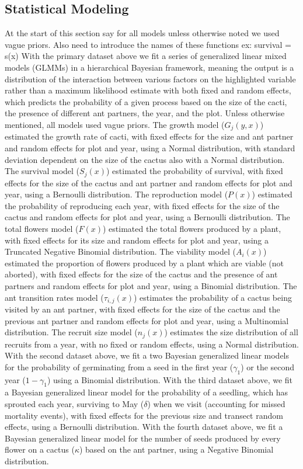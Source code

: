 \documentclass[12pt,a4paper]{article}
\begin{document}
		\subsection*{Statistical Modeling}
		At the start of this section say for all models unless otherwise noted we used vague priors. 
		Also need to introduce the names of these functions ex: survival = s(x)
		With the primary dataset above we fit a series of generalized linear mixed models (GLMMs) in a hierarchical Bayesian framework, meaning the output is a distribution of the interaction between various factors on the highlighted variable rather than a maximum likelihood estimate with both fixed and random effects, which predicts the probability of a given process based on the size of the cacti, the presence of different ant partners, the year, and the plot.
		Unless otherwise mentioned, all models used vague priors. 
		The growth model ($G_j(y,x)$) estimated the growth rate of cacti, with fixed effects for the size and ant partner and random effects for plot and year, using a Normal distribution, with standard deviation dependent on the size of the cactus also with a Normal distribution. 
		The survival model ($S_j(x)$) estimated the probability of survival, with fixed effects for the size of the cactus and ant partner and random effects for plot and year, using a Bernoulli distribution. 
		The reproduction model ($P(x)$) estimated the probability of reproducing each year, with fixed effects for the size of the cactus and random effects for plot and year, using a Bernoulli distribution. 
		The total flowers model ($F(x)$) estimated the total flowers produced by a plant, with fixed effects for its size and random effects for plot and year, using a Truncated Negative Binomial distribution. 
		The viability model ($A_i(x)$) estimated the proportion of flowers produced by a plant which are viable (not aborted), with fixed effects for the size of the cactus and the presence of ant partners and random effects for plot and year, using a Binomial distribution.
		The ant transition rates model ($\tau_{i,j}(x)$) estimates the probability of a cactus being visited by an ant partner, with fixed effects for the size of the cactus and the previous ant partner and random effects for plot and year, using a Multinomial distribution.  
		The recruit size model ($n_j(x)$) estimates the size distribution of all recruits from a year, with no fixed or random effects, using a Normal distribution. 
		With the second dataset above, we fit a two Bayesian generalized linear models for the 
		probability of germinating from a seed in the first year ($\gamma_1$) or the second year ($1 - \gamma_1$) using a Binomial distribution.
		With the third dataset above, we fit a Bayesian generalized linear model for the probability of a seedling, which has sprouted each year, surviving to May ($\delta$) when we visit (accounting for missed mortality events), with fixed effects for the previous size and transect random effects, using a Bernoulli distribution. 
		With the fourth dataset above, we fit a Bayesian generalized linear model for the number of seeds produced by every flower on a cactus ($\kappa$) based on the ant partner, using a Negative Binomial distribution. 
		
\end{document}
